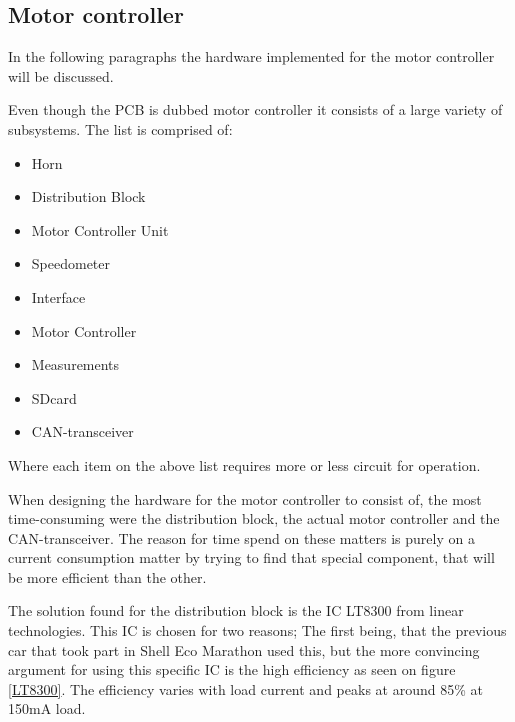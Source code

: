 \subsection*{Motor controller}
In the following paragraphs the hardware implemented for the motor controller will be discussed. 

Even though the PCB is dubbed motor controller it consists of a large variety of subsystems. The list is comprised of: 

\begin{itemize}
	\item{Horn}
	\item{Distribution Block}
	\item{Motor Controller Unit}
	\item{Speedometer}
	\item{Interface}
	\item{Motor Controller}
	\item{Measurements}
	\item{SDcard}
	\item{CAN-transceiver}
\end{itemize}

Where each item on the above list requires more or less circuit for operation. 

When designing the hardware for the motor controller to consist of, the most time-consuming were the distribution block, the actual motor controller and the CAN-transceiver. The reason for time spend on these matters is purely on a current consumption matter by trying to find that special component, that will be more efficient than the other. 

The solution found for the distribution block is the IC LT8300\cite{LT8300} from linear technologies. This IC is chosen for two reasons; The first being, that the previous car that took part in Shell Eco Marathon used this, but the more convincing argument for using this specific IC is the high efficiency as seen on figure \vref{LT8300}. The efficiency varies with load current and peaks at around 85\% at 150mA load.  

